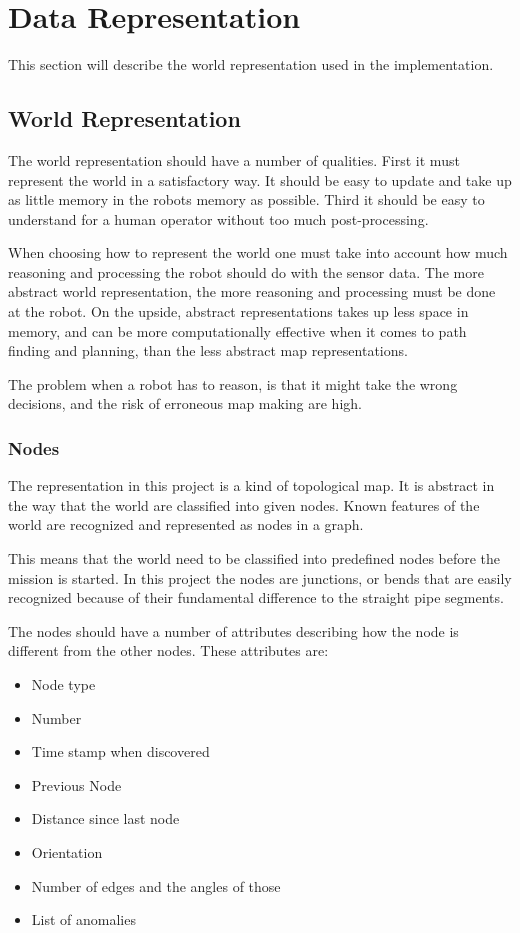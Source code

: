 

\chapter{Data Representation}
This section will describe the world representation used in the implementation.

\section{World Representation}
The world representation should have a number of qualities. First it must represent the
world in a satisfactory way. It should be easy to update and take up as little memory in
the robots memory as possible. Third it should be easy to understand for a human operator
without too much post-processing. 

When choosing how to represent the world one must take into account how much reasoning and
processing the robot should do with the sensor data. The more abstract world
representation, the more reasoning and processing must be done at the robot. On the
upside, abstract representations takes up less space in memory, and can be more
computationally effective when it comes to path finding and planning, than the less
abstract map representations. 

The problem when a robot has to reason, is that it might take the wrong decisions, and the
risk of erroneous map making are high. 

\subsection{Nodes}
The representation in this project is a kind of topological map. It is abstract in the way
that the world are classified into given nodes. Known features of the world are recognized
and represented as nodes in a graph. 

This means that the world need to be classified into predefined nodes before the mission
is started. In this project the nodes are junctions, or bends that are easily recognized
because of their fundamental difference to the straight pipe segments. 

The nodes should have a number of attributes describing how the node is different from the
other nodes. These attributes are:
\begin{itemize}
    \item Node type
    \item Number
    \item Time stamp when discovered
    \item Previous Node
    \item Distance since last node
    \item Orientation
    \item Number of edges and the angles of those
    \item List of anomalies
\end{itemize}

